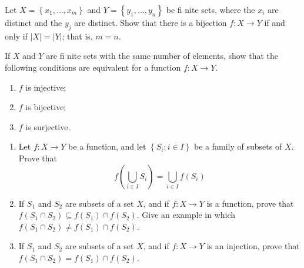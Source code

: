 \begin{questions}
\begin{solution}
    
\end{solution}


\question
    Let \(X=\left\{x_1, \ldots, x_m\right\}\) and \(Y=\left\{y_1, \ldots, y_n\right\}\) be fi nite sets, where the \(x_i\) are distinct and the \(y_j\) are distinct. Show that there is a bijection \(f: X \rightarrow Y\) if and only if \(|X|=|Y|\); that is, \(m=n\).


\begin{solution}
    
\end{solution}


    If \(X\) and \(Y\) are fi nite sets with the same number of elements, show that the following conditions are equivalent for a function \(f: X \rightarrow Y\).
    \begin{enumerate}[label=(\alph*)]
        \item \(f\) is injective;
        \item \(f\) is bijective;
        \item \(f\) is surjective.
    \end{enumerate}



\begin{solution}
    
\end{solution}


\question
    \begin{enumerate}[label=(\alph*)]
        \item Let \(f: X \rightarrow Y\) be a function, and let \(\left\{S_i: i \in I\right\}\) be a family of subsets of \(X\). Prove that
\[
f\left(\bigcup_{i \in I} S_i\right)=\bigcup_{i \in I} f\left(S_i\right)
\]

        \item If \(S_1\) and \(S_2\) are subsets of a set \(X\), and if \(f: X \rightarrow Y\) is a function, prove that \(f\left(S_1 \cap S_2\right) \subseteq f\left(S_1\right) \cap f\left(S_2\right)\). Give an example in which \(f\left(S_1 \cap S_2\right) \neq f\left(S_1\right) \cap f\left(S_2\right)\).
        
        \item If \(S_1\) and \(S_2\) are subsets of a set \(X\), and if \(f: X \rightarrow Y\) is an injection, prove that \(f\left(S_1 \cap S_2\right)=f\left(S_1\right) \cap f\left(S_2\right)\).
    \end{enumerate}



\end{questions}
